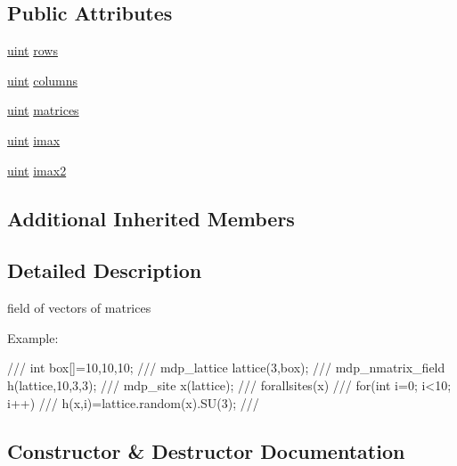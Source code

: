 \subsection*{Public Attributes}
\begin{DoxyCompactItemize}
\item 
\hyperlink{mdp__global__vars_8h_a91ad9478d81a7aaf2593e8d9c3d06a14}{uint} \hyperlink{classmdp__nmatrix__field_a6166f4d394efa361e3fa9552506c7c36}{rows}
\item 
\hyperlink{mdp__global__vars_8h_a91ad9478d81a7aaf2593e8d9c3d06a14}{uint} \hyperlink{classmdp__nmatrix__field_aaa3de1fa235579a53d5b4a3bc1ef504e}{columns}
\item 
\hyperlink{mdp__global__vars_8h_a91ad9478d81a7aaf2593e8d9c3d06a14}{uint} \hyperlink{classmdp__nmatrix__field_a7ace5d4385ddb2f67a8f1c5e65fbf22e}{matrices}
\item 
\hyperlink{mdp__global__vars_8h_a91ad9478d81a7aaf2593e8d9c3d06a14}{uint} \hyperlink{classmdp__nmatrix__field_a3f49b21188df1a14427384d3501b8926}{imax}
\item 
\hyperlink{mdp__global__vars_8h_a91ad9478d81a7aaf2593e8d9c3d06a14}{uint} \hyperlink{classmdp__nmatrix__field_acc8ab22ea97de1a94f6e3abe818cbafa}{imax2}
\end{DoxyCompactItemize}
\subsection*{Additional Inherited Members}


\subsection{Detailed Description}
field of vectors of matrices 

Example\+: \begin{DoxyVerb}///    int box[]={10,10,10};
///    mdp_lattice lattice(3,box);
///    mdp_nmatrix_field h(lattice,10,3,3);
///    mdp_site x(lattice);
///    forallsites(x)
///      for(int i=0; i<10; i++)
///        h(x,i)=lattice.random(x).SU(3);
/// \end{DoxyVerb}
 

\subsection{Constructor \& Destructor Documentation}
\mbox{\label{classmdp__nmatrix__field_a2431fcb07b72317d2bf87e46ddad80b1}} 
